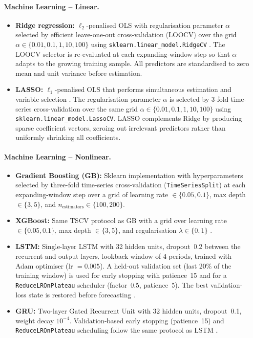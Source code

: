 \paragraph{Machine Learning -- Linear.}
\begin{itemize}
  \item \textbf{Ridge regression:} $\ell_2$-penalised OLS with regularisation parameter $\alpha$ selected by efficient leave-one-out cross-validation (LOOCV) over the grid $\alpha \in \{0.01, 0.1, 1, 10, 100\}$ using \texttt{sklearn.linear\_model.RidgeCV} \citep{hoerl1970ridge}.  The LOOCV selector is re-evaluated at each expanding-window step so that $\alpha$ adapts to the growing training sample.  All predictors are standardised to zero mean and unit variance before estimation.
  \item \textbf{LASSO:} $\ell_1$-penalised OLS that performs simultaneous estimation and variable selection \citep{tibshirani1996regression}.  The regularisation parameter $\alpha$ is selected by 3-fold time-series cross-validation over the same grid $\alpha \in \{0.01, 0.1, 1, 10, 100\}$ using \texttt{sklearn.linear\_model.LassoCV}.  LASSO complements Ridge by producing sparse coefficient vectors, zeroing out irrelevant predictors rather than uniformly shrinking all coefficients.
\end{itemize}

\paragraph{Machine Learning -- Nonlinear.}
\begin{itemize}
  \item \textbf{Gradient Boosting (GB):} Sklearn implementation with hyperparameters selected by three-fold time-series cross-validation (\texttt{TimeSeriesSplit}) at each expanding-window step over a grid of learning rate $\in \{0.05, 0.1\}$, max depth $\in \{3, 5\}$, and $n_\text{estimators} \in \{100, 200\}$.
  \item \textbf{XGBoost:} Same TSCV protocol as GB with a grid over learning rate $\in \{0.05, 0.1\}$, max depth $\in \{3, 5\}$, and regularisation $\lambda \in \{0, 1\}$ \citep{chen2016xgboost}.
  \item \textbf{LSTM:} Single-layer LSTM with 32 hidden units, dropout~0.2 between the recurrent and output layers, lookback window of 4 periods, trained with Adam optimiser (lr $= 0.005$).  A held-out validation set (last 20\% of the training window) is used for early stopping with patience~15 and for a \texttt{ReduceLROnPlateau} scheduler (factor~0.5, patience~5).  The best validation-loss state is restored before forecasting \citep{hochreiter1997long}.
  \item \textbf{GRU:} Two-layer Gated Recurrent Unit with 32 hidden units, dropout~0.1, weight decay $10^{-4}$.  Validation-based early stopping (patience~15) and \texttt{ReduceLROnPlateau} scheduling follow the same protocol as LSTM \citep{cho2014learning}.
\end{itemize}


